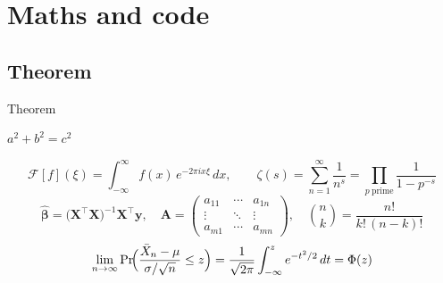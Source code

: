 
\section{Maths and code}

\subsection{Theorem}
\begin{frame}{Theorem}
    \begin{theorem}[Pythagoras]
        $a^{2}+b^{2}=c^{2}$
    \end{theorem}

    \begin{theorem}
        \[
            \mathcal{F}[f](\xi)=\int_{-\infty}^{\infty} f(x)\,e^{-2\pi i x\xi}\,dx,\qquad
            \zeta(s)=\sum_{n=1}^{\infty}\frac{1}{n^{s}}=\prod_{p\ \mathrm{prime}}\frac{1}{1-p^{-s}}
        \]
        \[
            \hat{\boldsymbol\beta}=\bigl(\mathbf{X}^{\top}\mathbf{X}\bigr)^{-1}\mathbf{X}^{\top}\mathbf{y},\quad
            \mathbf{A}=\begin{pmatrix}a_{11}&\cdots&a_{1n}\\\vdots&\ddots&\vdots\\a_{m1}&\cdots&a_{mn}\end{pmatrix},\quad
            \binom{n}{k}=\frac{n!}{k!\,(n-k)!}
        \]
        \[
            \lim_{n\to\infty}\Pr\!\Bigl(\frac{\bar{X}_n-\mu}{\sigma/\sqrt{n}}\le z\Bigr)
            =\frac{1}{\sqrt{2\pi}}\int_{-\infty}^{z}e^{-t^{2}/2}\,dt=\Phi(z)
        \]
    \end{theorem}
\end{frame}

